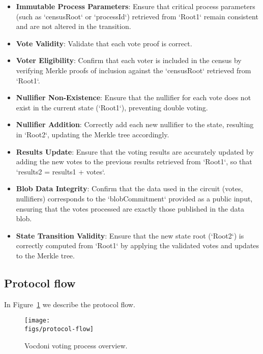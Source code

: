 \begin{itemize}
	\item \textbf{Immutable Process Parameters}: Ensure that critical process parameters (such as `censusRoot` or `processId`) retrieved from `Root1` remain consistent and are not altered in the transition.
	\item \textbf{Vote Validity}: Validate that each vote proof is correct.
	\item \textbf{Voter Eligibility}: Confirm that each voter is included in the census by verifying Merkle proofs of inclusion against the `censusRoot` retrieved from `Root1`.
	\item \textbf{Nullifier Non-Existence}: Ensure that the nullifier for each vote does not exist in the current state (`Root1`), preventing double voting.
	\item \textbf{Nullifier Addition}: Correctly add each new nullifier to the state, resulting in `Root2`, updating the Merkle tree accordingly.
	\item \textbf{Results Update}: Ensure that the voting results are accurately updated by adding the new votes to the previous results retrieved from `Root1`, so that `results2 = results1 + votes`.
	\item \textbf{Blob Data Integrity}: Confirm that the data used in the circuit (votes, nullifiers) corresponds to the `blobCommitment` provided as a public input, ensuring that the votes processed are exactly those published in the data blob.
	\item \textbf{State Transition Validity}: Ensure that the new state root (`Root2`) is correctly computed from `Root1` by applying the validated votes and updates to the Merkle tree.
\end{itemize}

\subsection{Protocol flow}
\label{sec:vocdoni-protocol:flow}

In Figure~\ref{fig:protocol-flow} we describe the protocol flow.


\begin{figure}[H]
	\centerline{\texttt{[image: \\figs/protocol-flow]}}
	\caption{Vocdoni voting process overview.}
	\label{fig:protocol-flow}
\end{figure}


